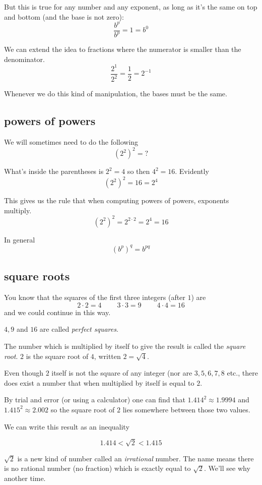\documentclass[11pt, oneside]{article}
\begin{document}
But this is true for any number and any exponent, as long as it's the same on top and bottom (and the base is not zero):
\[ \frac{b^p}{b^p} = 1 = b^0 \]

We can extend the idea to fractions where the numerator is smaller than the denominator.
\[ \frac{2^1}{2^2} = \frac{1}{2} = 2^{-1} \]

Whenever we do this kind of manipulation, the bases must be the same.

\subsection*{powers of powers}

We will sometimes need to do the following
\[ (2^2)^2  = \text{?} \]

What's inside the parentheses is $2^2 = 4$ so then $4^2 = 16$.  Evidently
\[ (2^2)^2  = 16 = 2^4 \]

This gives us the rule that when computing powers of powers, exponents multiply.
\[ (2^2)^2 = 2^{2 \cdot 2} = 2^4 = 16 \]

In general
\[ (b^p)^q = b^{pq} \]

\subsection*{square roots}

You know that the squares of the first three integers (after $1$) are
\[ 2 \cdot 2 = 4 \ \ \ \ \ \ \ \ \ \ 3 \cdot 3 = 9 \ \ \ \ \ \ \ \ \ \ 4 \cdot 4 = 16 \]
and we could continue in this way.

$4,9$ and $16$ are called \emph{perfect squares}.

The number which is multiplied by itself to give the result is called the \emph{square root}.  $2$ is the square root of $4$, written $2 = \sqrt{4}$.

Even though $2$ itself is not the square of any integer (nor are $3,5,6,7,8$ etc., there does exist a number that when multiplied by itself is equal to $2$.  

By trial and error (or using a calculator) one can find that $1.414^2 \approx 1.9994$ and $1.415^2 \approx 2.002$ so the square root of $2$ lies somewhere between those two values.  

We can write this result as an inequality

\[ 1.414 < \sqrt{2} < 1.415 \]

$\sqrt{2}$ is a new kind of number called an \emph{irrational} number.  The name means there is no rational number (no fraction) which is exactly equal to $\sqrt{2}$.  We'll see why another time.  
\end{document}
